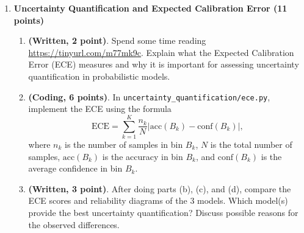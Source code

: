 \documentclass[
  letterpaper,
  numbers=noenddot,
  DIV=11]{scrreprt}
\theoremstyle{plain}
\theoremstyle{definition}
\theoremstyle{plain}
\theoremstyle{remark}
\begin{document}
\begin{enumerate}
\def\labelenumi{(\alph{enumi})}
\item
  \textbf{Uncertainty Quantification and Expected Calibration Error (11
  points)}

  \begin{enumerate}
  \def\labelenumii{(\roman{enumii})}
  \item
    \textbf{(Written, 2 point)}. Spend some time reading
    \url{https://tinyurl.com/m77mk9c}. Explain what the Expected
    Calibration Error (ECE) measures and why it is important for
    assessing uncertainty quantification in probabilistic models.
  \item
    \textbf{(Coding, 6 points)}. In
    \texttt{uncertainty\_quantification/ece.py}, implement the ECE using
    the formula
    \[\text{ECE} = \sum_{k=1}^K \frac{n_k}{N} \left| \text{acc}(B_k) - \text{conf}(B_k) \right|,\]
    where \(n_k\) is the number of samples in bin \(B_k\), \(N\) is the
    total number of samples, \(\text{acc}(B_k)\) is the accuracy in bin
    \(B_k\), and \(\text{conf}(B_k)\) is the average confidence in bin
    \(B_k\).
  \item
    \textbf{(Written, 3 point)}. After doing parts (b), (c), and (d),
    compare the ECE scores and reliability diagrams of the 3 models.
    Which model(s) provide the best uncertainty quantification? Discuss
    possible reasons for the observed differences.
  \end{enumerate}
\end{enumerate}
\end{document}
